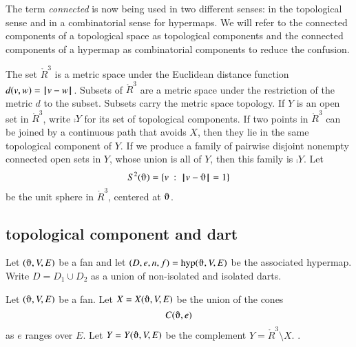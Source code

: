 \begin{remark} The term {\it connected} is now being used in
two different senses: in the topological sense and in a combinatorial
sense for hypermaps.   We will refer to the connected components
of a topological space as topological components and the connected
components of a hypermap as combinatorial components to reduce the confusion.
\end{remark}






The set $\ring{R}^3$ is a metric space under the
Euclidean distance function $d(v,w) = {\hskip0.1em|\hskip-0.15em|\hskip0.1em}v - w{\hskip0.1em|\hskip-0.15em|\hskip0.1em}$.  Subsets of
$\ring{R}^3$ are a metric space under the restriction of the metric
$d$ to the subset. Subsets carry the metric space topology. 
If $Y$ is an open set in $\ring{R}^3$, write
$\comp{Y}$ for its set of topological components.
If two
points in $\ring{R}^3$ 
can be joined by a continuous path that avoids $X$,
then they lie in the same topological component of $Y$.
If we produce a family of pairwise disjoint nonempty connected open sets in
$Y$, whose union is all of $Y$, then
this family is $\comp{Y}$.
Let $$S^2(\orgn) = \{ v \mid \norm{ v}{\orgn } = 1\}$$ be the unit sphere in
$\ring{R}^3$, centered at $\orgn$.  






\subsection{topological component and dart}

Let $(\orgn,V,E)$ be a fan and let $(D,e,n,f) = \op{hyp}(\orgn,V,E)$
be the associated hypermap.  Write $D = D_1\cup D_2$ as a union of
non-isolated and isolated darts.

\begin{definition}[X,~Y]\label{def:XY}
Let $(\orgn,V,E)$ be a fan.  Let $X=X(\orgn,V,E)$ be the union of the
cones
   $$C(\orgn,e)$$
as $e$ ranges over $E$.  Let $Y=Y(\orgn,V,E)$ be the complement
$Y = \ring{R}^3\setminus X$.
.
\end{definition}


